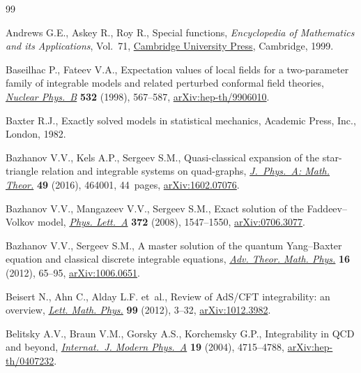 \documentclass[pdftex]{sigma}
\numberwithin{equation}{section}
\begin{document}
\begin{thebibliography}{99}
\footnotesize\itemsep=0pt

Andrews G.E., Askey R., Roy R., Special functions, \textit{Encyclopedia of
 Mathematics and its Applications}, Vol.~71, \href{https://doi.org/10.1017/CBO9781107325937}{Cambridge University Press},
 Cambridge, 1999.

Baseilhac P., Fateev V.A., Expectation values of local fields for a
 two-parameter family of integrable models and related perturbed conformal
 field theories, \href{https://doi.org/10.1016/S0550-3213(98)00525-2}{\textit{Nuclear Phys.~B}} \textbf{532} (1998), 567--587,
 \href{https://arxiv.org/abs/hep-th/9906010}{arXiv:hep-th/9906010}.

Baxter R.J., Exactly solved models in statistical mechanics, Academic Press,
 Inc., London, 1982.

Bazhanov V.V., Kels A.P., Sergeev S.M., Quasi-classical expansion of the
 star-triangle relation and integrable systems on quad-graphs,
 \href{https://doi.org/10.1088/1751-8113/49/46/464001}{\textit{J.~Phys.~A: Math. Theor.}} \textbf{49} (2016), 464001, 44~pages,
 \href{https://arxiv.org/abs/1602.07076}{arXiv:1602.07076}.

Bazhanov V.V., Mangazeev V.V., Sergeev S.M., Exact solution of the
 {F}addeev--{V}olkov model, \href{https://doi.org/10.1016/j.physleta.2007.10.053}{\textit{Phys. Lett.~A}} \textbf{372} (2008),
 1547--1550, \href{https://arxiv.org/abs/0706.3077}{arXiv:0706.3077}.

Bazhanov V.V., Sergeev S.M., A master solution of the quantum {Y}ang--{B}axter
 equation and classical discrete integrable equations, \href{https://doi.org/10.4310/ATMP.2012.v16.n1.a3}{\textit{Adv. Theor.
 Math. Phys.}} \textbf{16} (2012), 65--95, \href{https://arxiv.org/abs/1006.0651}{arXiv:1006.0651}.

Beisert N., Ahn C., Alday L.F. et~al., Review of {A}d{S}/{CFT} integrability:
 an overview, \href{https://doi.org/10.1007/s11005-011-0529-2}{\textit{Lett. Math. Phys.}} \textbf{99} (2012), 3--32,
 \href{https://arxiv.org/abs/1012.3982}{arXiv:1012.3982}.

Belitsky A.V., Braun V.M., Gorsky A.S., Korchemsky G.P., Integrability in {QCD}
 and beyond, \href{https://doi.org/10.1142/S0217751X04019895}{\textit{Internat.~J. Modern Phys.~A}} \textbf{19} (2004),
 4715--4788, \href{https://arxiv.org/abs/hep-th/0407232}{arXiv:hep-th/0407232}.


\end{thebibliography}
\end{document}
